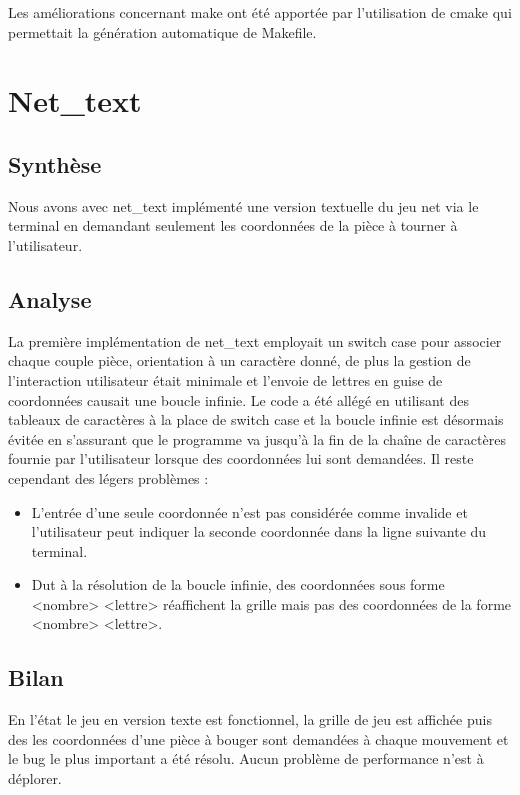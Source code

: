 \documentclass[12pt]{article}
\begin{document}
Les améliorations concernant make ont été apportée par l'utilisation de cmake qui permettait la 
génération automatique de Makefile.



\section{Net\_text}
\subsection{Synthèse}

Nous avons avec net\_text implémenté une version textuelle du jeu net via le terminal en demandant
seulement les coordonnées de la pièce à tourner à l'utilisateur.

\subsection{Analyse}

La première implémentation de net\_text employait un switch case pour associer chaque couple 
pièce, orientation à un caractère donné, de plus la gestion de l'interaction utilisateur 
était minimale et l'envoie de lettres en guise de coordonnées causait une boucle infinie.
Le code a été allégé en utilisant des tableaux de caractères à la place de switch case et 
la boucle infinie est désormais évitée en s'assurant que le programme va jusqu'à la fin de 
la chaîne de caractères fournie par l'utilisateur lorsque des coordonnées lui sont demandées.
Il reste cependant des légers problèmes : 
\begin{itemize}
\item L'entrée d'une seule coordonnée n'est pas considérée comme invalide et l'utilisateur peut indiquer la seconde coordonnée dans la ligne suivante du terminal.
\item Dut à la résolution de la boucle infinie, des coordonnées sous forme <nombre> <lettre> réaffichent la grille mais pas des coordonnées de la forme <nombre> <lettre>.
\end{itemize}

\subsection{Bilan}

En l'état le jeu en version texte est fonctionnel, la grille de jeu est affichée puis des 
les coordonnées d'une pièce à bouger sont demandées à chaque mouvement et le bug le plus 
important a été résolu. Aucun problème de performance n'est à déplorer.
\end{document}
